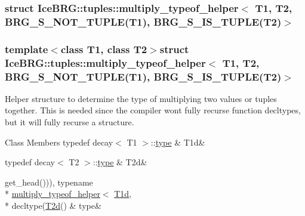 \subsubsection{struct Ice\+B\+R\+G\+:\+:tuples\+:\+:multiply\+\_\+typeof\+\_\+helper$<$ T1, T2, B\+R\+G\+\_\+\+S\+\_\+\+N\+O\+T\+\_\+\+T\+U\+P\+L\+E(T1), B\+R\+G\+\_\+\+S\+\_\+\+I\+S\+\_\+\+T\+U\+P\+L\+E(T2)$>$}
\subsubsection*{template$<$class T1, class T2$>$struct Ice\+B\+R\+G\+::tuples\+::multiply\+\_\+typeof\+\_\+helper$<$ T1, T2, B\+R\+G\+\_\+\+S\+\_\+\+N\+O\+T\+\_\+\+T\+U\+P\+L\+E(\+T1), B\+R\+G\+\_\+\+S\+\_\+\+I\+S\+\_\+\+T\+U\+P\+L\+E(\+T2)$>$}

Helper structure to determine the type of multiplying two values or tuples together. This is needed since the compiler won\textquotesingle{}t fully recurse function decltypes, but it will fully recurse a structure. \begin{DoxyFields}{Class Members}
\hypertarget{namespaceIceBRG_1_1tuples_aeb527db06a943494eb8e1b53b3bb1ac4}{}typedef decay$<$ T1 $>$\+::\hyperlink{namespaceIceBRG_1_1tuples_a9a6a86c894d9573bf12cdca5810c7d31}{type}\label{namespaceIceBRG_1_1tuples_aeb527db06a943494eb8e1b53b3bb1ac4}
&
T1d&
\\
\hline

\hypertarget{namespaceIceBRG_1_1tuples_a2d1618c5821f55cdbd9b5a9d470ac18e}{}typedef decay$<$ T2 $>$\+::\hyperlink{namespaceIceBRG_1_1tuples_a9a6a86c894d9573bf12cdca5810c7d31}{type}\label{namespaceIceBRG_1_1tuples_a2d1618c5821f55cdbd9b5a9d470ac18e}
&
T2d&
\\
\hline

\hypertarget{namespaceIceBRG_1_1tuples_a9a6a86c894d9573bf12cdca5810c7d31}{}get\+\_\+head())), typename \\*
\hyperlink{namespaceIceBRG_1_1tuples_structIceBRG_1_1tuples_1_1multiply__typeof__helper}{multiply\+\_\+typeof\+\_\+helper}$<$ \hyperlink{namespaceIceBRG_1_1tuples_aeb527db06a943494eb8e1b53b3bb1ac4}{T1d}, \\*
decltype(\hyperlink{namespaceIceBRG_1_1tuples_a2d1618c5821f55cdbd9b5a9d470ac18e}{T2d}()\label{namespaceIceBRG_1_1tuples_a9a6a86c894d9573bf12cdca5810c7d31}
&
type&
\\
\hline

\end{DoxyFields}
\label{structIceBRG_1_1tuples_1_1sct__typeof__helper}
\hypertarget{namespaceIceBRG_1_1tuples_structIceBRG_1_1tuples_1_1sct__typeof__helper}{}
